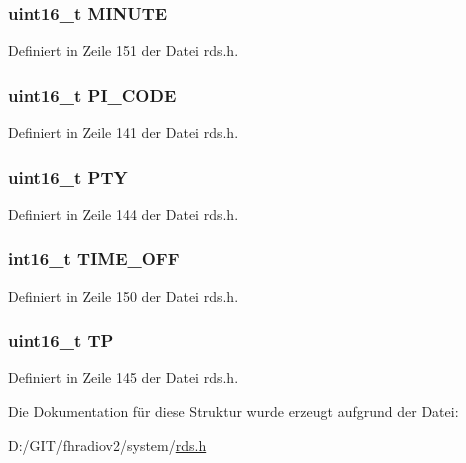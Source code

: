 \subsubsection[{M\+I\+N\+U\+T\+E}]{\setlength{\rightskip}{0pt plus 5cm}uint16\+\_\+t M\+I\+N\+U\+T\+E}\label{structgroup__4a_a4377c294f04582b75e2fcd4134fdeb46}


Definiert in Zeile 151 der Datei rds.\+h.

\hypertarget{structgroup__4a_a5cd9b1f6413028425796c1129aa8fd87}{}
\subsubsection[{P\+I\+\_\+\+C\+O\+D\+E}]{\setlength{\rightskip}{0pt plus 5cm}uint16\+\_\+t P\+I\+\_\+\+C\+O\+D\+E}\label{structgroup__4a_a5cd9b1f6413028425796c1129aa8fd87}


Definiert in Zeile 141 der Datei rds.\+h.

\hypertarget{structgroup__4a_a0474967478fbbc2c71b800d2e0132d45}{}
\subsubsection[{P\+T\+Y}]{\setlength{\rightskip}{0pt plus 5cm}uint16\+\_\+t P\+T\+Y}\label{structgroup__4a_a0474967478fbbc2c71b800d2e0132d45}


Definiert in Zeile 144 der Datei rds.\+h.

\hypertarget{structgroup__4a_ad17cf07501152f576f64d6bf9d06b453}{}
\subsubsection[{T\+I\+M\+E\+\_\+\+O\+F\+F}]{\setlength{\rightskip}{0pt plus 5cm}int16\+\_\+t T\+I\+M\+E\+\_\+\+O\+F\+F}\label{structgroup__4a_ad17cf07501152f576f64d6bf9d06b453}


Definiert in Zeile 150 der Datei rds.\+h.

\hypertarget{structgroup__4a_ab9e634c63b0d95a96716d5f6d7f06d72}{}
\subsubsection[{T\+P}]{\setlength{\rightskip}{0pt plus 5cm}uint16\+\_\+t T\+P}\label{structgroup__4a_ab9e634c63b0d95a96716d5f6d7f06d72}


Definiert in Zeile 145 der Datei rds.\+h.



Die Dokumentation für diese Struktur wurde erzeugt aufgrund der Datei\+:\begin{DoxyCompactItemize}
\item 
D\+:/\+G\+I\+T/fhradiov2/system/\hyperlink{rds_8h}{rds.\+h}\end{DoxyCompactItemize}
